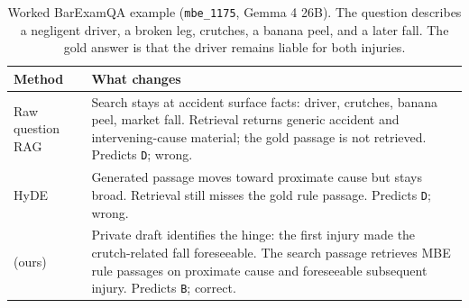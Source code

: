 \begin{table}[t]
\centering
\caption{Worked BarExamQA example (\texttt{mbe\_1175}, Gemma 4 26B). The
question describes a negligent driver, a broken leg, crutches, a banana peel,
and a later fall. The gold answer is that the driver remains liable for both
injuries.}
\label{tab:worked_examples}
\footnotesize
\begin{tabularx}{\columnwidth}{lY}
\toprule
Method & What changes \\
\midrule
Raw question RAG
& Search stays at accident surface facts: driver, crutches, banana peel,
market fall. Retrieval returns generic accident and intervening-cause material;
the gold passage is not retrieved. Predicts \texttt{D}; wrong. \\
\addlinespace
HyDE
& Generated passage moves toward proximate cause but stays broad. Retrieval
still misses the gold rule passage. Predicts \texttt{D}; wrong. \\
\addlinespace
\hyre{} (ours)
& Private draft identifies the hinge: the first injury made the crutch-related
fall foreseeable. The search passage retrieves MBE rule passages on proximate
cause and foreseeable subsequent injury. Predicts \texttt{B}; correct. \\
\bottomrule
\end{tabularx}
\end{table}
